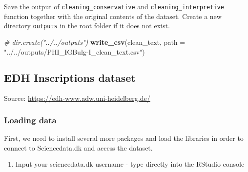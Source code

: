 \documentclass[]{article}
\newenvironment{Shaded}{\begin{snugshade}}{\end{snugshade}}
\newcommand{\CommentTok}[1]{\textcolor[rgb]{0.56,0.35,0.01}{\textit{#1}}}
\newcommand{\DataTypeTok}[1]{\textcolor[rgb]{0.13,0.29,0.53}{#1}}
\newcommand{\KeywordTok}[1]{\textcolor[rgb]{0.13,0.29,0.53}{\textbf{#1}}}
\newcommand{\NormalTok}[1]{#1}
\newcommand{\OperatorTok}[1]{\textcolor[rgb]{0.81,0.36,0.00}{\textbf{#1}}}
\newcommand{\StringTok}[1]{\textcolor[rgb]{0.31,0.60,0.02}{#1}}
\providecommand{\tightlist}{%
  \setlength{\itemsep}{0pt}\setlength{\parskip}{0pt}}
\begin{document}
Save the output of \texttt{cleaning\_conservative} and
\texttt{cleaning\_interpretive} function together with the original
contents of the dataset. Create a new directory \texttt{outputs} in the
root folder if it does not exist.

\begin{Shaded}
\end{Shaded}

\begin{Shaded}
\begin{Highlighting}[]
\CommentTok{# dir.create("../../outputs")}
\KeywordTok{write_csv}\NormalTok{(clean_text, }\DataTypeTok{path =} \StringTok{"../../outputs/PHI_IGBulg-I_clean_text.csv"}\NormalTok{)}
\end{Highlighting}
\end{Shaded}

\hypertarget{edh-inscriptions-dataset}{%
\subsection{EDH Inscriptions dataset}\label{edh-inscriptions-dataset}}

Source: \url{https://edh-www.adw.uni-heidelberg.de/}

\hypertarget{loading-data-1}{%
\subsubsection{Loading data}\label{loading-data-1}}

First, we need to install several more packages and load the libraries
in order to connect to Sciencedata.dk and access the dataset.

\begin{enumerate}
\def\labelenumi{\arabic{enumi}.}
\tightlist
\item
  Input your sciencedata.dk username - type directly into the RStudio
  console
\end{enumerate}
\end{document}
